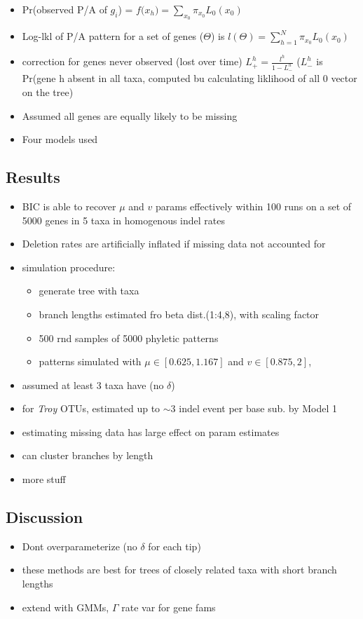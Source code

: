 \documentclass[10pt,letter]{article}
\begin{document}
\begin{itemize}
    \item Pr(observed P/A of $g_i$) = $f($\textbf{$x_h$}$) = \sum_{x_0} \pi_{x_0}L_0(x_0)$
    \item Log-lkl of P/A pattern for a set of genes ($\Theta$) is $l(\Theta) = \sum_{h=1}^{N} \pi_{x_0}L_0(x_0)$
    \item correction for genes never observed (lost over time) $L^h_+ = \frac{l^h}{1-L^h_-}$ ($L^h_-$ is Pr(gene h absent in all taxa, computed bu calculating liklihood of all 0 vector on the tree)
    \item Assumed all genes are equally likely to be missing
    \item Four models used
\end{itemize}
\subsection*{Results}
\begin{itemize}
    \item BIC is able to recover $\mu$ and $v$ params effectively within 100 runs on a set of 5000 genes in 5 taxa in homogenous indel rates
    \item Deletion rates are artificially inflated if missing data not accounted for
    \item simulation procedure:
    \begin{itemize}
        \item generate tree with taxa
        \item branch lengths estimated fro beta dist.(1:4,8), with scaling factor
        \item 500 rnd samples of 5000 phyletic patterns
        \item patterns simulated with $\mu \in [0.625,1.167]$ and $v \in [0.875,2]$,
    \end{itemize}
    \item assumed at least 3 taxa have (no $\delta$)
    \item for \textit{Troy} OTUs, estimated up to $\sim 3$ indel event per base sub. by Model 1
    \item estimating missing data has large effect on param estimates
    \item can cluster branches by length
    \item more stuff
\end{itemize}
\subsection*{Discussion}
\begin{itemize}
    \item Dont overparameterize (no $\delta$ for each tip)
    \item these methods are best for trees of closely related taxa with short branch lengths
    \item extend with GMMs, $\Gamma$ rate var for gene fams
\end{itemize}
\end{document}
